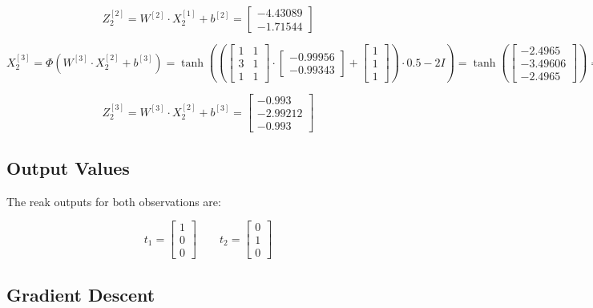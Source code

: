 \documentclass{article}
\begin{document}
\[ Z^{[2]}_2 = W^{[2]} \cdot X^{[1]}_2 + b^{[2]} = \begin{bmatrix} -4.43089 \\ -1.71544 \end{bmatrix} \]

\[ X^{[3]}_2 = \Phi(W^{[3]} \cdot X^{[2]}_2 + b^{[3]}) = \tanh \left( \left(\begin{bmatrix} 1 & 1  \\ 3 & 1 \\ 1 & 1 \end{bmatrix} \cdot \begin{bmatrix} -0.99956 \\ -0.99343 \end{bmatrix} + \begin{bmatrix} 1 \\ 1 \\ 1 \end{bmatrix} \right) \cdot 0.5 - 2I \right) = \tanh \left( \begin{bmatrix} -2.4965 \\ -3.49606 \\ -2.4965 \end{bmatrix} \right)  = \begin{bmatrix} -0.98652 \\ -0.99816 \\ -0.98652 \end{bmatrix} \]

\[ Z^{[3]}_2 = W^{[3]} \cdot X^{[2]}_2 + b^{[3]} = \begin{bmatrix} -0.993 \\ -2.99212 \\ -0.993 \end{bmatrix} \]

\subsection*{Output Values}

The reak outputs for both observations are:

\[ t_1 = \begin{bmatrix} 1 \\ 0 \\ 0 \end{bmatrix} \qquad t_2 = \begin{bmatrix} 0 \\ 1 \\ 0 \end{bmatrix} \]

\subsection*{Gradient Descent}
\end{document}

